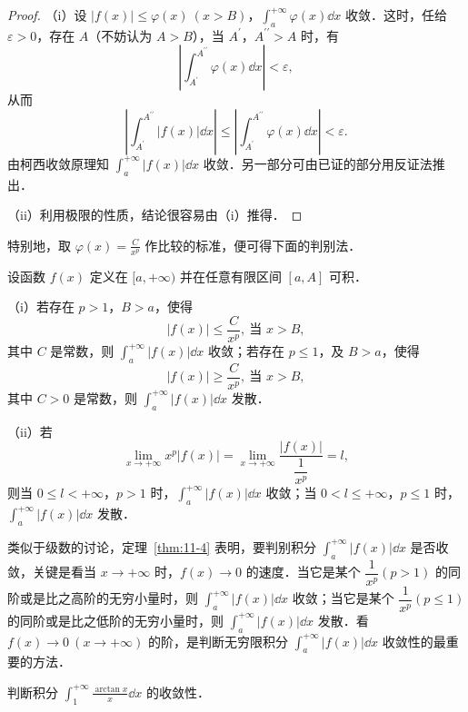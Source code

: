 \begin{proof}
（i）设 $\left|f(x)\right|\leqslant\varphi(x)\ (x>B)$，$\displaystyle\int_{a}^{+\infty}\varphi(x)\dd x$ 收敛．这时，任给 $\varepsilon>0$，存在 $A$（不妨认为 $A>B$），当 $A^{\prime}$，$A^{\prime\prime}>A$ 时，有
\[
\left|\int_{A^{\prime}}^{A^{\prime\prime}}\varphi(x)\dd x\right|<\varepsilon,
\]
从而
\[
\left|\int_{A^{\prime}}^{A^{\prime\prime}}\left|f(x)\right|\dd x\right|\leqslant\left|\int_{A^{\prime}}^{A^{\prime\prime}}\varphi(x)\dd x\right|<\varepsilon.
\]
由柯西收敛原理知 $\displaystyle\int_{a}^{+\infty}\left|f(x)\right|\dd x$ 收敛．另一部分可由已证的部分用反证法推出．

（ii）利用极限的性质，结论很容易由（i）推得．
\end{proof}

特别地，取 $\displaystyle\varphi(x)=\frac{C}{x^{p}}$ 作比较的标准，便可得下面的判别法．

\begin{theorem}\label{thm:11-4}
设函数 $f(x)$ 定义在 $[a,+\infty)$ 并在任意有限区间 $[a,A]$ 可积．

（i）若存在 $p>1$，$B>a$，使得
\[
\left|f(x)\right|\leqslant\frac{C}{x^{p}},\ \text{当 }x>B,
\]
其中 $C$ 是常数，则 $\displaystyle\int_{a}^{+\infty}\left|f(x)\right|\dd x$ 收敛；若存在 $p\leqslant 1$，及 $B>a$，使得
\[
\left|f(x)\right|\geqslant\frac{C}{x^{p}},\ \text{当 }x>B,
\]
其中 $C>0$ 是常数，则 $\displaystyle\int_{a}^{+\infty}\left|f(x)\right|\dd x$ 发散．

（ii）若
\[
\lim_{x\to+\infty}x^{p}\left|f(x)\right|=\lim_{x\to+\infty}\frac{\left|f(x)\right|}{\dfrac{1}{x^{p}}}=l,
\]
则当 $0\leqslant l<+\infty$，$p>1$ 时，$\displaystyle\int_{a}^{+\infty}\left|f(x)\right|\dd x$ 收敛；当 $0<l\leqslant+\infty$，$p\leqslant 1$ 时，$\displaystyle\int_{a}^{+\infty}\left|f(x)\right|\dd x$ 发散．
\end{theorem}

类似于级数的讨论，定理~\ref{thm:11-4} 表明，要判别积分 $\displaystyle\int_{a}^{+\infty}\left|f(x)\right|\dd x$ 是否收敛，关键是看当 $x\to+\infty$ 时，$f(x)\to 0$ 的速度．当它是某个 $\dfrac{1}{x^{p}}(p>1)$ 的同阶或是比之高阶的无穷小量时，则 $\displaystyle\int_{a}^{+\infty}\left|f(x)\right|\dd x$ 收敛；当它是某个 $\dfrac{1}{x^{p}}(p\leqslant 1)$ 的同阶或是比之低阶的无穷小量时，则 $\displaystyle\int_{a}^{+\infty}\left|f(x)\right|\dd x$ 发散．看 $f(x)\to 0\ (x\to+\infty)$ 的阶，是判断无穷限积分 $\displaystyle\int_{a}^{+\infty}\left|f(x)\right|\dd x$ 收敛性的最重要的方法．

\begin{example}\label{ex:11-1-6}
判断积分 $\displaystyle\int_{1}^{+\infty}\frac{\arctan x}{x}\dd x$ 的收敛性．
\end{example}

